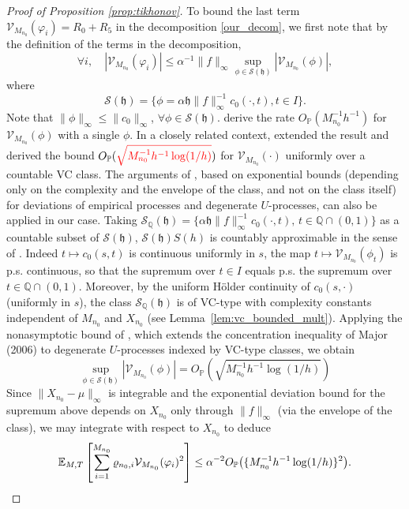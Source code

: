 \documentclass{article}
\begin{document}
\begin{proof}[Proof of Proposition \ref{prop:tikhonov}]
To bound the last term $\mathcal{V}_{M_{n_0}} (\varphi_i)=R_0+R_5$ in the decomposition \eqref{our_decom}, we first note that by the definition of the terms in the decomposition, 
$$
\forall i,\quad |\mathcal V_{M_{n_0}} (\varphi_i)|\leq \alpha^{-1}  \|f \|_\infty \sup_{\phi\in \mathcal S(\mathfrak h)} \left| \mathcal V_{M_{n_0}}(\phi)\right|,
$$
where 
$$
\mathcal S (\mathfrak h)= \{\phi= \alpha \mathfrak h \|f \|_\infty ^{-1}c_0(\cdot,t), t\in I\}.
$$
\color{black}
Note that $\|\phi\|_\infty \leq \|c_0\|_\infty$, $\forall \phi\in \mathcal S (\mathfrak h)$. 
\cite{DP2016} derive the rate $O_{\mathbb P}(M_{n_0}^{-1} h^{-1})$ for $\mathcal V_{M_{n_0}}(\phi)$ with a single $\phi$.
In a closely related context, \cite{CP2018} extended the result and derived the  bound $O_{\mathbb P}(\textcolor{red}{\sqrt{M_{n_0}^{-1} h^{-1}\log(1/h)}})$ for $\mathcal V_{M_{n_0}}(\cdot)$ uniformly over a countable VC class. The arguments of \cite{CP2018}, based on exponential bounds (depending only on the complexity and the envelope of the class, and not on the class itself) for deviations of  empirical processes and degenerate $U$-processes, can also be applied in our case.
\color{red}
Taking $\mathcal{S}_{\mathbb{Q}}(\mathfrak{h}) = \{\alpha\mathfrak{h}\|f\|_\infty^{-1}c_0(\cdot,t),\, t\in\mathbb{Q}\cap(0,1)\}$ as a countable subset of $\mathcal{S}(\mathfrak{h})$, $\mathcal{S}(\mathfrak{h})
S(h)$ is countably approximable in the sense of \citet{major2006estimate}.
Indeed $t\mapsto c_0(s,t)$ is continuous uniformly in $s$, the map $t\mapsto \mathcal{V}_{M_{n_0}}(\phi_t)$ is p.s. continuous, so that the supremum over $t\in I$ equals p.s. the supremum over $t\in\mathbb{Q}\cap(0,1)$.
Moreover, by the uniform Hölder continuity of $c_0(s,\cdot)$ (uniformly in $s$), the class $\mathcal{S}_{\mathbb{Q}}(\mathfrak{h})$ is of VC-type with complexity constants independent of $M_{n_0}$ and $X_{n_0}$ (see Lemma~\ref{lem:vc_bounded_mult}).
Applying the nonasymptotic bound of \citet[Lemma 3]{CP2018}, which extends the concentration inequality of Major (2006) to degenerate $U$-processes indexed by VC-type classes, we obtain
$$
\sup_{\phi \in \mathcal{S}(\mathfrak{h})} |\mathcal{V}_{M_{n_0}}(\phi)| = O_{\mathbb{P}}\!\left(\sqrt{M_{n_0}^{-1}h^{-1}\log(1/h)}\right)
$$
Since $\|X_{n_0}-\mu\|_\infty$ is integrable and the exponential deviation bound for the supremum above depends on $X_{n_0}$ only through $\|f\|_\infty$ (via the envelope of the class), we may integrate with respect to $X_{n_0}$ to deduce
\begin{equation}\label{CP_bound2b}
\mathbb{E}_{M,T}\left[ \sum_{i=1}^{M_{n_0}} \varrho_{n_0,i} \mathcal V_{M_{n_0}}(\varphi_i) ^2 \right] \leq \alpha^{-2} O_{\mathbb P}\big(\{M_{n_0}^{-1} h^{-1}\log(1/h)\}^2\big).
\end{equation} 
\color{black}
 

\end{proof}
\end{document}
